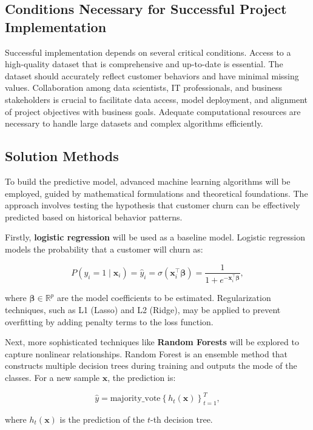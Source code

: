\documentclass[12pt]{article}
\begin{document}
\subsection*{Conditions Necessary for Successful Project Implementation}

Successful implementation depends on several critical conditions. Access to a high-quality dataset that is comprehensive and up-to-date is essential. The dataset should accurately reflect customer behaviors and have minimal missing values. Collaboration among data scientists, IT professionals, and business stakeholders is crucial to facilitate data access, model deployment, and alignment of project objectives with business goals. Adequate computational resources are necessary to handle large datasets and complex algorithms efficiently.

\subsection*{Solution Methods}

To build the predictive model, advanced machine learning algorithms will be employed, guided by mathematical formulations and theoretical foundations. The approach involves testing the hypothesis that customer churn can be effectively predicted based on historical behavior patterns.

Firstly, \textbf{logistic regression} will be used as a baseline model. Logistic regression models the probability that a customer will churn as:

\[
P(y_i = 1 \mid \mathbf{x}_i) = \hat{y}_i = \sigma(\mathbf{x}_i^\top \boldsymbol{\beta}) = \frac{1}{1 + e^{-\mathbf{x}_i^\top \boldsymbol{\beta}}},
\]

where \(\boldsymbol{\beta} \in \mathbb{R}^p\) are the model coefficients to be estimated. Regularization techniques, such as L1 (Lasso) and L2 (Ridge), may be applied to prevent overfitting by adding penalty terms to the loss function.

Next, more sophisticated techniques like \textbf{Random Forests} will be explored to capture nonlinear relationships. Random Forest is an ensemble method that constructs multiple decision trees during training and outputs the mode of the classes. For a new sample \(\mathbf{x}\), the prediction is:

\[
\hat{y} = \text{majority\_vote}\left\{ h_t(\mathbf{x}) \right\}_{t=1}^T,
\]

where \(h_t(\mathbf{x})\) is the prediction of the \(t\)-th decision tree.
\end{document}
